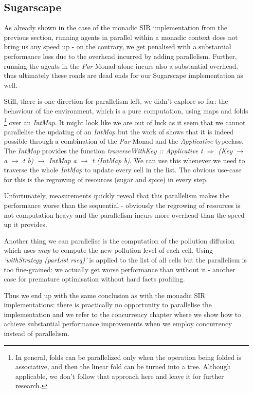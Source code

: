 \subsection{Sugarscape}
As already shown in the case of the monadic SIR implementation from the previous section, running agents in parallel within a monadic context does not bring us any speed up - on the contrary, we get penalised with a substantial performance loss due to the overhead incurred by adding parallelism. Further, running the agents in the \textit{Par} Monad alone incurs also a substantial overhead, thus ultimately these roads are dead ends for our Sugarscape implementation as well.

Still, there is one direction for parallelism left, we didn't explore so far: the behaviour of the environment, which is a pure computation, using maps and folds \footnote{In general, folds can be parallelized only when the operation being folded is associative, and then the linear fold can be turned into a tree. Although applicable, we don't follow that approach here and leave it for further research.} over an \textit{IntMap}. It might look like we are out of luck as it seem that we cannot parallelise the updating of an \textit{IntMap} but the work of \cite{marlow_parallel_2013} shows that it is indeed possible through a combination of the \textit{Par} Monad and the \textit{Applicative} typeclass. The \textit{IntMap} provides the function \textit{traverseWithKey :: Applicative t $\Rightarrow$ (Key $\rightarrow$ a $\rightarrow$ t b) $\rightarrow$ IntMap a $\rightarrow$ t (IntMap b)}. We can use this whenever we need to traverse the whole \textit{IntMap} to update every cell in the list. The obvious use-case for this is the regrowing of resources (sugar and spice) in every step.

Unfortunately, measurements quickly reveal that this parallelism makes the performance worse than the sequential - obviously the regrowing of resources is not computation heavy and the parallelism incurs more overhead than the speed up it provides.

Another thing we can parallelise is the computation of the pollution diffusion which uses \textit{map} to compute the new pollution level of each cell. Using \textit{'withStrategy (parList rseq)'} is applied to the list of all cells but the parallelism is too fine-grained: we actually get worse performance than without it - another case for premature optimisation without hard facts profiling.

Thus we end up with the same conclusion as with the monadic SIR implementations: there is practically no opportunity to parallelise the implementation and we refer to the concurrency chapter where we show how to achieve substantial performance improvements when we employ concurrency instead of parallelism.